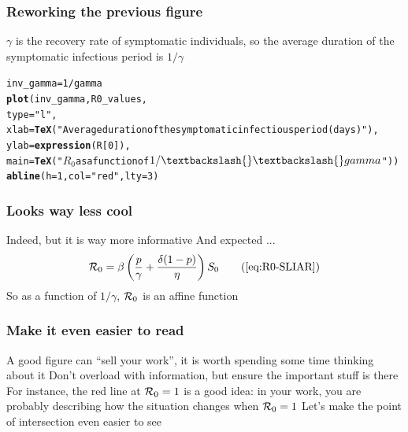 \documentclass[aspectratio=169]{beamer}\usepackage[]{graphicx}\usepackage[]{xcolor}
\makeatletter
\newcommand{\hlnum}[1]{\textcolor[rgb]{0.686,0.059,0.569}{#1}}%
\newcommand{\hlsng}[1]{\textcolor[rgb]{0.192,0.494,0.8}{#1}}%
\newcommand{\hlopt}[1]{\textcolor[rgb]{0,0,0}{#1}}%
\newcommand{\hldef}[1]{\textcolor[rgb]{0.345,0.345,0.345}{#1}}%
\newcommand{\hlkwb}[1]{\textcolor[rgb]{0.69,0.353,0.396}{#1}}%
\newcommand{\hlkwc}[1]{\textcolor[rgb]{0.333,0.667,0.333}{#1}}%
\newcommand{\hlkwd}[1]{\textcolor[rgb]{0.737,0.353,0.396}{\textbf{#1}}}%
\newenvironment{kframe}{%
 \def\at@end@of@kframe{}%
 \ifinner\ifhmode%
  \def\at@end@of@kframe{\end{minipage}}%
  \begin{minipage}{\columnwidth}%
 \fi\fi%
 \def\FrameCommand##1{\hskip\@totalleftmargin \hskip-\fboxsep
 \colorbox{shadecolor}{##1}\hskip-\fboxsep
     \hskip-\linewidth \hskip-\@totalleftmargin \hskip\columnwidth}%
 \MakeFramed {\advance\hsize-\width
   \@totalleftmargin\z@ \linewidth\hsize
   \@setminipage}}%
 {\par\unskip\endMakeFramed%
 \at@end@of@kframe}
\newenvironment{knitrout}{}{} %
\makeatother
\begin{document}
\begin{frame}[fragile]\frametitle{Reworking the previous figure}
$\gamma$ is the recovery rate of symptomatic individuals, so the average duration of the symptomatic infectious period is $1/\gamma$
\vfill
\begin{knitrout}
\color{fgcolor}\begin{kframe}
\begin{alltt}
\hldef{inv_gamma} \hlkwb{=} \hlnum{1}\hlopt{/}\hldef{gamma}
\hlkwd{plot}\hldef{(inv_gamma, R0_values,}
     \hlkwc{type}\hldef{=}\hlsng{"l"}\hldef{,}
     \hlkwc{xlab}\hldef{=}\hlkwd{TeX}\hldef{(}\hlsng{"Average duration of the symptomatic infectious period (days)"}\hldef{),}
     \hlkwc{ylab}\hldef{=}\hlkwd{expression}\hldef{(R[}\hlnum{0}\hldef{]),}
     \hlkwc{main} \hldef{=} \hlkwd{TeX}\hldef{(}\hlsng{"$R_0$ as a function of $1/\textbackslash{}\textbackslash{}gamma$"}\hldef{))}
\hlkwd{abline}\hldef{(}\hlkwc{h}\hldef{=}\hlnum{1}\hldef{,} \hlkwc{col}\hldef{=}\hlsng{"red"}\hldef{,} \hlkwc{lty} \hldef{=} \hlnum{3}\hldef{)}
\end{alltt}
\end{kframe}
\end{knitrout}
\end{frame}


\begin{frame}\frametitle{Looks way less cool}
Indeed, but it is way more informative
\vfill
And expected ...
\begin{equation}
\mathcal{R}_0=\beta
\left(
\frac{p}{\gamma}+\frac{\delta(1-p)}{\eta}
\right)S_0
\tag{\ref{eq:R0-SLIAR}}
\end{equation}
\vfill
So as a function of $1/\gamma$, $\mathcal{R}_0$ is an affine function
\end{frame}

\begin{frame}\frametitle{Make it even easier to read}
A good figure can ``sell your work'', it is worth spending some time thinking about it
\vfill
Don't overload with information, but ensure the important stuff is there
\vfill
For instance, the red line at $\mathcal{R}_0=1$ is a good idea: in your work, you are probably describing how the situation changes when $\mathcal{R}_0=1$
\vfill
Let's make the point of intersection even easier to see
\end{frame}
\end{document}
